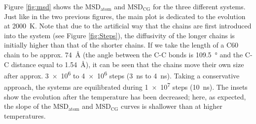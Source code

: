 \documentclass[aps,prb,reprint,superscriptaddress, a4paper]{revtex4-1}
\begin{document}
Figure \ref{fig:msd} shows the  $\text{MSD}_{\text{atom}}$ and $\text{MSD}_{\text{CG}}$ for the three different systems. Just like in the two previous figures, the main plot is dedicated to the evolution at  \SI{2000}{\kelvin}. Note that due to the artificial way that the chains are first introduced into the system (see Figure \ref{fig:Steps}), the diffusivity of the longer chains is initially higher than that of the shorter chains.  If we take the length of a C60 chain to be approx. \SI{74}{\angstrom} (the angle between the C-C bonds is \SI{109.5}{\degree} and the C-C distance equal to \SI{1.54}{\angstrom}),  it can be seen that the chains move their own size after approx. \SI{3e6}{} to  \SI{4e6}{} steps (\SI{3}{\nano\second} to \SI{4}{\nano\second}). Taking a conservative approach, the systems are equilibrated during  \SI{1e7}{} steps (\SI{10}{\nano\second}). The insets show the evolution after the temperature has been decreased; here, as expected, the slope of the $\text{MSD}_{\text{atom}}$ and $\text{MSD}_{\text{CG}}$ curves is shallower than at higher temperatures. 
\end{document}
